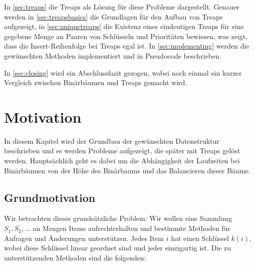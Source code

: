 \documentclass[a4paper]{scrreprt}
\theoremstyle{definition}
\begin{document}
In \ref{sec:treaps} die Treaps als Lösung für diese Probleme dargestellt. Genauer werden in \ref{sec:treapsbasics} die Grundlagen für den Aufbau von Treaps aufgezeigt, in \ref{sec:uniquetreaps} die Existenz eines eindeutigen Treaps für eine gegebene Menge an Paaren von Schlüsseln und Prioritäten bewiesen, was zeigt, dass die Insert-Reihenfolge bei Treaps egal ist. In \ref{sec:implementing} werden die gewünschten Methoden implementiert und in Pseudocode beschrieben.


In \ref{sec:closing} wird ein Abschlussfazit gezogen, wobei noch einmal ein kurzer Vergleich zwischen Binärbäumen und Treaps gemacht wird. %

\chapter{Motivation}
\label{sec:motivation}

In diesem Kapitel wird der Grundbau der gewünschten Datenstruktur beschrieben und es werden Probleme aufgezeigt, die später mit Treaps gelöst werden. Hauptsächlich geht es dabei um die Abhängigkeit der Laufzeiten bei Binärbäumen von der Höhe des Binärbaums und das Balancieren dieser Bäume.

\section{Grundmotivation}
\label{sec:motivationbasics}

Wir betrachten dieses grundsätzliche Problem: Wir wollen eine Sammlung ${S_1, S_2, ...}$ an Mengen Items aufrechterhalten und bestimmte Methoden für Anfragen und Änderungen unterstützen. Jedes Item $i$ hat einen Schlüssel $k(i)$, wobei diese Schlüssel linear geordnet sind und jeder einzigartig ist. Die zu unterstützenden Methoden sind die folgenden:
\end{document}
